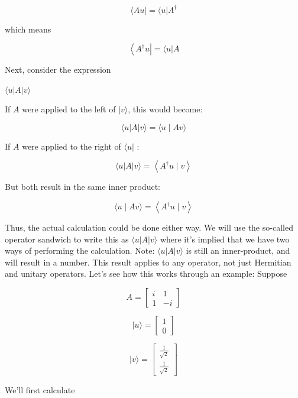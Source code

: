 \documentclass[main.tex]{subfiles}
\begin{document}
    $$
    \langle A u|=\langle u| A^{\dagger}
    $$
    
    which means
    
    $$
    \left\langle A^{\dagger} u\right|=\langle u| A
    $$
    
    Next, consider the expression
    
    $\langle u|A| v\rangle$
    
    If $A$ were applied to the left of $|v\rangle$, this would become:
    
    $$
    \langle u|A| v\rangle=\langle u \mid A v\rangle
    $$
    
    If $A$ were applied to the right of $\langle u|$ :
    
    $$
    \langle u|A| v\rangle=\left\langle A^{\dagger} u \mid v\right\rangle
    $$
    
    But both result in the same inner product:
    
    $$
    \langle u \mid A v\rangle=\left\langle A^{\dagger} u \mid v\right\rangle
    $$
    
    Thus, the actual calculation could be done either way. We will use the so-called operator sandwich to write this as $\langle u|A| v\rangle$ where it's implied that we have two ways of performing the calculation. Note: $\langle u|A| v\rangle$ is still an inner-product, and will result in a number. This result applies to any operator, not just Hermitian and unitary operators.
    Let's see how this works through an example: Suppose
    
    $$
    A=\left[\begin{array}{cc}
    i & 1 \\
    1 & -i
    \end{array}\right]
    $$
    
    $$
    |u\rangle=\left[\begin{array}{l}
    1 \\
    0
    \end{array}\right]
    $$
    
    $$
    |v\rangle=\left[\begin{array}{c}
    \frac{1}{\sqrt{2}} \\
    \frac{1}{\sqrt{2}}
    \end{array}\right]
    $$
    
    We'll first calculate
    
\end{document}
